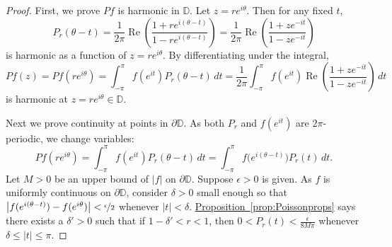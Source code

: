 \documentclass[12pt,openany]{book}
\renewcommand{\Re}{\operatorname{Re}}
\newcommand{\sabs}[1]{\lvert {#1} \rvert}
\newcommand{\babs}[1]{\bigl\lvert {#1} \bigr\rvert}
\newcommand{\D}{{\mathbb{D}}}
\theoremstyle{plain}
\theoremstyle{remark}
\theoremstyle{definition}
\theoremstyle{exercise}
\theoremstyle{example}
\newcommand{\propref}[1]{\hyperref[#1]{Proposition~\ref*{#1}}}
\begin{document}
\begin{proof}
First, we prove $Pf$ is harmonic in $\D$.  Let $z = re^{i\theta}$.
Then for any fixed $t$,
\begin{equation*}
P_r(\theta-t)
=
\frac{1}{2\pi}
\Re
\left(
\frac{1+re^{i(\theta-t)}}{1-re^{i(\theta-t)}}
\right) 
=
\frac{1}{2\pi}
\Re
\left(
\frac{1+ze^{-it}}{1-ze^{-it}}
\right)
\end{equation*}
is harmonic as a function of $z=re^{i\theta}$.
By differentiating under the integral,
\begin{equation*}
Pf(z)
=
Pf(re^{i\theta})
=
\int_{-\pi}^\pi f(e^{it}) P_r(\theta-t) \, dt
=
\frac{1}{2\pi}
\int_{-\pi}^\pi f(e^{it}) 
\Re
\left(
\frac{1+z e^{-it}}{1-z e^{-it}}
\right) 
\, dt
\end{equation*}
is harmonic at $z = re^{i\theta} \in \D$.

Next we prove continuity at points in $\partial \D$.
As both $P_r$ and $f(e^{it})$ are $2 \pi$-periodic, we 
change variables:
\begin{equation*}
Pf(re^{i\theta})
=
\int_{-\pi}^\pi f(e^{it}) P_r(\theta-t) \, dt
=
\int_{-\pi}^\pi f\bigl(e^{i(\theta-t)}\bigr) P_r(t) \, dt .
\end{equation*}
Let $M > 0$ be an upper bound of
$\sabs{f}$ on $\partial \D$.  Suppose $\epsilon > 0$ is given.
As $f$ is uniformly continuous on $\partial \D$, consider $\delta > 0$
small enough so that $\babs{f(e^{i(\theta-t)})-f(e^{i\theta})} <
\nicefrac{\epsilon}{2}$ whenever $\sabs{t} < \delta$.
\propref{prop:Poissonprops} says there exists
a $\delta' > 0$ such that if  
$1-\delta' < r < 1$, then
$0 < P_r(t) < \frac{\epsilon}{8M\pi}$
whenever $\delta \leq \sabs{t} \leq \pi$.


\end{proof}
\end{document}
